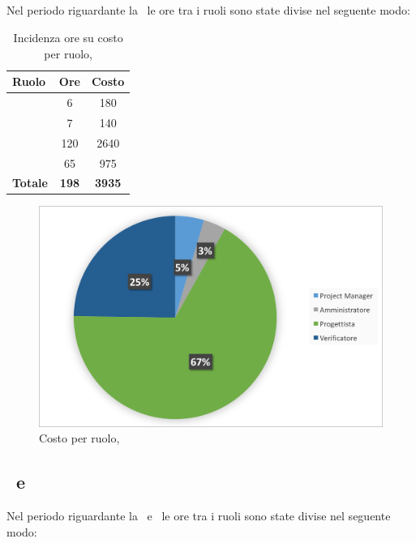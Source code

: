\newpage
\subsection{\PA}
Nel periodo riguardante la \PA\ le ore tra i ruoli sono state divise nel seguente modo:

\begin{table}[h]
	\begin{center}
		\begin{tabular}{|l|c|c|}
			\hline
			\textbf{Ruolo}	& \textbf{Ore} &	\textbf{Costo}	 \\
			\hline
			\textit{\Pm}	&	6	&	180\\
			\hline
			\textit{\Am}	&	7	&	140\\
			\hline
			\textit{\Prog}	&	120	&	2640\\
			\hline
			\textit{\Ver}	&	65	&	975\\
			\hline
			\textbf{Totale}	&	\textbf{198}	&	\textbf{3935}\\
			\hline
		\end{tabular}
	\end{center}
	\caption{Incidenza ore su costo per ruolo, \PA}
\end{table}

\begin{figure}[H]
	\centering 
	\includegraphics[scale=0.7]{Immagini/GraficiTorteSezione6/PA.png}
	\caption{Costo per ruolo, \PA}
\end{figure}

\newpage
\subsection{\PD\ e \COD}
Nel periodo riguardante la \PD\ e \COD\ le ore tra i ruoli sono state divise nel seguente modo:

